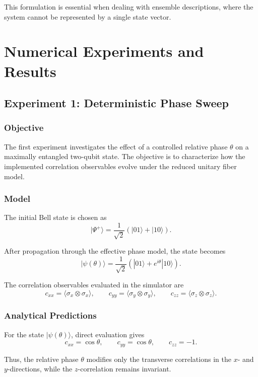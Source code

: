 \documentclass[a4paper]{article}
\begin{document}
This formulation is essential when dealing with ensemble descriptions, where the system cannot be represented by a single state vector.


\section{Numerical Experiments and Results}

\subsection{Experiment 1: Deterministic Phase Sweep}

\subsubsection{Objective}

The first experiment investigates the effect of a controlled relative phase \(\theta\) on a maximally entangled two-qubit state. The objective is to characterize how the implemented correlation observables evolve under the reduced unitary fiber model.

\subsubsection{Model}

The initial Bell state is chosen as
\[
|\Psi^{+}\rangle
=
\frac{1}{\sqrt{2}}
\left(
|01\rangle + |10\rangle
\right).
\]

After propagation through the effective phase model, the state becomes
\[
|\psi(\theta)\rangle
=
\frac{1}{\sqrt{2}}
\left(
|01\rangle + e^{i\theta}|10\rangle
\right).
\]

The correlation observables evaluated in the simulator are
\[
c_{xx} = \langle \sigma_x \otimes \sigma_x \rangle,\qquad
c_{yy} = \langle \sigma_y \otimes \sigma_y \rangle,\qquad
c_{zz} = \langle \sigma_z \otimes \sigma_z \rangle.
\]

\subsubsection{Analytical Predictions}

For the state \( |\psi(\theta)\rangle \), direct evaluation gives
\[
c_{xx} = \cos\theta,\qquad
c_{yy} = \cos\theta,\qquad
c_{zz} = -1.
\]

Thus, the relative phase \(\theta\) modifies only the transverse correlations in the \(x\)- and \(y\)-directions, while the \(z\)-correlation remains invariant.
\end{document}
